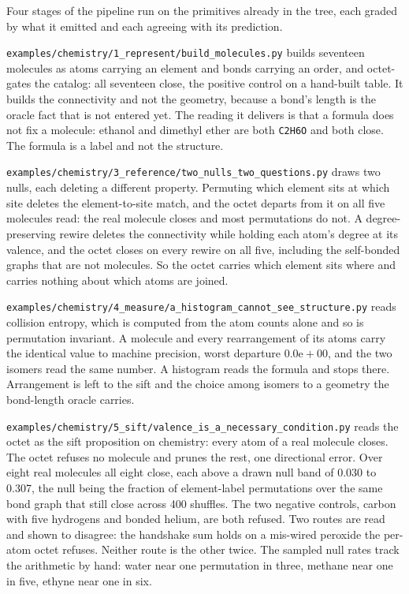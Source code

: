 Four stages of the pipeline run on the primitives already in the tree, each graded by what it emitted
and each agreeing with its prediction.

\texttt{examples/chemistry/1\_represent/build\_molecules.py} builds seventeen molecules as atoms
carrying an element and bonds carrying an order, and octet-gates the catalog: all seventeen close, the
positive control on a hand-built table. It builds the connectivity and not the geometry, because a
bond's length is the oracle fact that is not entered yet. The reading it delivers is that a formula
does not fix a molecule: ethanol and dimethyl ether are both \texttt{C2H6O} and both close. The
formula is a label and not the structure.

\texttt{examples/chemistry/3\_reference/two\_nulls\_two\_questions.py} draws two nulls, each deleting a
different property. Permuting which element sits at which site deletes the element-to-site match, and
the octet departs from it on all five molecules read: the real molecule closes and most permutations
do not. A degree-preserving rewire deletes the connectivity while holding each atom's degree at its
valence, and the octet closes on every rewire on all five, including the self-bonded graphs that are
not molecules. So the octet carries which element sits where and carries nothing about which atoms are
joined.

\texttt{examples/chemistry/4\_measure/a\_histogram\_cannot\_see\_structure.py} reads collision entropy,
which is computed from the atom counts alone and so is permutation invariant. A molecule and every
rearrangement of its atoms carry the identical value to machine precision, worst departure
\(0.0\mathrm{e}{+}00\), and the two isomers read the same number. A histogram reads the formula and stops
there. Arrangement is left to the sift and the choice among isomers to a geometry the bond-length
oracle carries.

\texttt{examples/chemistry/5\_sift/valence\_is\_a\_necessary\_condition.py} reads the octet as the sift
proposition on chemistry: every atom of a real molecule closes. The octet refuses no molecule and
prunes the rest, one directional error. Over eight real molecules all eight close, each above a drawn
null band of 0.030 to 0.307, the null being the fraction of element-label permutations over the same
bond graph that still close across 400 shuffles. The two negative controls, carbon with five hydrogens
and bonded helium, are both refused. Two routes are read and shown to disagree: the handshake sum
holds on a mis-wired peroxide the per-atom octet refuses. Neither route is the other twice. The
sampled null rates track the arithmetic by hand: water near one permutation in three, methane near one
in five, ethyne near one in six.

